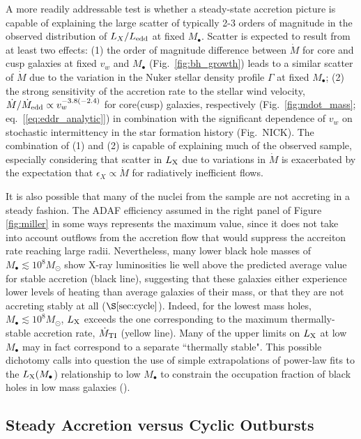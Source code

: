 \documentclass[usenatbib,fleqn]{mn2e}
\begin{document}
A more readily addressable test is whether a steady-state accretion picture is capable of explaining the large scatter of typically 2-3 orders of magnitude in the observed distribution of $L_{X}/L_{\rm edd}$ at fixed $M_{\bullet}$.  Scatter is expected to result from at least two effects: (1) the order of magnitude difference between $\dot{M}$ for core and cusp galaxies at fixed $v_w$ and $M_{\bullet}$ (Fig.~\ref{fig:bh_growth}) leads to a similar scatter of $\dot{M}$ due to the variation in the Nuker stellar density profile $\Gamma$ at fixed $M_{\bullet}$; (2) the strong sensitivity of the accretion rate to the stellar wind velocity, $\dot{M}/\dot{M}_{\rm edd} \propto v_{w}^{-3.8(-2.4)}$ for core(cusp) galaxies, respectively (Fig.~\ref{fig:mdot_mass}; eq.~[\ref{eq:eddr_analytic}]) in combination with the significant dependence of $v_w$ on stochastic intermittency in the star formation history (Fig.~NICK).  The combination of (1) and (2) is capable of explaining much of the observed sample, especially considering that scatter in $L_{\rm X}$ due to variations in $\dot{M}$ is exacerbated by the expectation that $\epsilon_{X} \propto \dot{M}$ for radiatively inefficient flows.  

It is also possible that many of the nuclei from the \citet{Miller+15} sample are not accreting in a steady fashion.  The ADAF efficiency assumed in the right panel of Figure \ref{fig:miller} in some ways represents the maximum value, since it does not take into account outflows from the accretion flow that would suppress the accreiton rate reaching large radii.  Nevertheless, many lower black hole masses of $M_{\bullet} \lesssim 10^{8}M_{\odot}$ show X-ray luminosities lie well above the predicted average value for stable accretion (black line), suggesting that these galaxies either experience lower levels of heating than average galaxies of their mass, or that they are not accreting stably at all ($\S\ref{sec:cycle}$).  Indeed, for the lowest mass holes, $M_{\bullet} \lesssim 10^{8}M_{\odot}$, $L_{\rm X}$ exceeds the one corresponding to the maximum thermally-stable accretion rate, $\dot{M}_{\rm TI}$ (yellow line).  Many of the upper limits on $L_{\rm X}$ at low $M_{\bullet}$ may in fact correspond to a separate ``thermally stable".  This possible dichotomy calls into question the use of simple extrapolations of power-law fits to the $L_{\rm X}(M_{\bullet}$) relationship to low $M_{\bullet}$ to constrain the occupation fraction of black holes in low mass galaxies (\citealt{Miller+15}).       


\subsection{Steady Accretion versus Cyclic Outbursts}
\label{sec:cycle}
\end{document}
